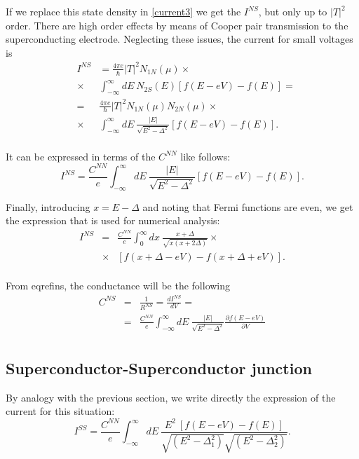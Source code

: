 \documentclass[twocolumn, twoside,a4paper,10pt]{article}
\begin{document}
If we replace this state density in \eqref{current3} we get the $I^{NS}$, but only up to $|T|^2$ order. There are high order effects by means of Cooper pair transmission to the superconducting electrode. Neglecting these issues, the current for small voltages is
\begin{eqnarray}\label{ins_previous}
&I^{NS}& = \frac{4\pi e}{\hbar} |T|^2 N_{1N}(\mu) \times
		\nonumber \\
		&\times& \int_{-\infty}^{\infty} dE\ N_{2S}(E) [f(E-eV)-f(E)] =
		\nonumber \\
		&=& \frac{4\pi e}{\hbar} |T|^2 N_{1N}(\mu) N_{2N}(\mu) \times
		\nonumber \\
		&\times& \int_{-\infty}^{\infty} dE\ \frac{|E|}{\sqrt{E^2-\Delta^2}} [f(E-eV)-f(E)].
		\nonumber \\
\end{eqnarray}

It can be expressed in terms of the $C^{NN}$ like follows:
\begin{equation}\label{ins}
I^{NS} = \frac{C^{NN}}{e} \int_{-\infty}^{\infty} dE\ \frac{|E|}{\sqrt{E^2-\Delta^2}} [f(E-eV)-f(E)].
\end{equation}

Finally, introducing $x=E-\Delta$ and noting that Fermi functions are even, we get the expression that is used for numerical analysis:
\begin{eqnarray}\label{ins_numerical}
I^{NS} &=& \frac{C^{NN}}{e} \int_{0}^{\infty} dx\ \frac{x+\Delta}{\sqrt{x(x+2 \Delta)}} \times
		\nonumber \\
		&\times& [f(x+ \Delta-eV)-f(x+ \Delta +eV)].
		\nonumber \\
\end{eqnarray}

From eqref{ins}, the conductance will be the following
\begin{eqnarray}\label{cns}
C^{NS} &=& \frac{1}{R^{NS}} = \frac{dI^{NS}}{dV} =
		\nonumber \\
		&=& \frac{C^{NN}}{e} \int_{-\infty}^{\infty} dE\ \frac{|E|}{\sqrt{E^2-\Delta^2}} 
		\frac{\partial f(E-eV)}{\partial V}
		\nonumber \\
\end{eqnarray}

\subsection{Superconductor-Superconductor junction} 
By analogy with the previous section, we write directly the expression of the current for this situation:
\begin{equation}\label{ins}
I^{SS} = \frac{C^{NN}}{e} \int_{-\infty}^{\infty} dE\ 
		\frac{E^2\ [f(E-eV)-f(E)]}{\sqrt{(E^2-\Delta_1 ^2)}\sqrt{(E^2-\Delta_2 ^2)}}.
\end{equation}
\end{document}
